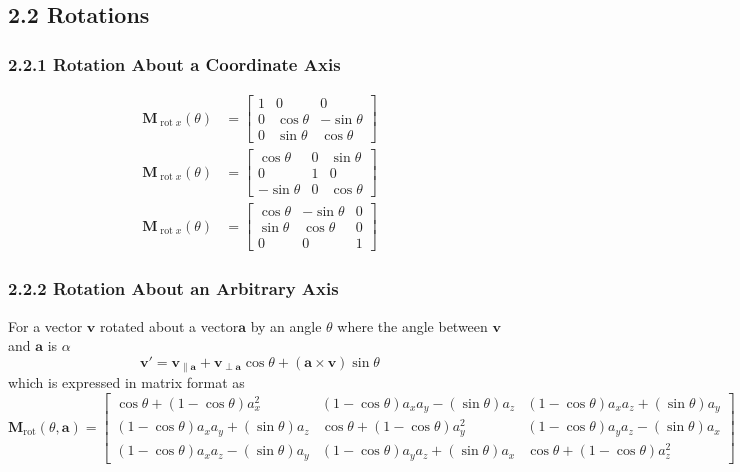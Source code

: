\documentclass[11pt]{article}
\newcommand{\bm}[1]{\mathbf{#1}}
\DeclareMathOperator{\rot}{rot}
\begin{document}
\subsection*{2.2 Rotations}
\subsubsection*{2.2.1 Rotation About a Coordinate Axis}
\begin{align}
    \bm{M}_{\rot x} \left(\theta\right) &= \begin{bmatrix}
        1 & 0 & 0 \\
        0 & \cos \theta & -\sin \theta \\
        0 & \sin \theta & \cos \theta
    \end{bmatrix} \\
    \bm{M}_{\rot x} \left(\theta\right) &= \begin{bmatrix}
        \cos \theta & 0 & \sin \theta \\
        0 & 1 & 0 \\
        -\sin \theta & 0 & \cos \theta
    \end{bmatrix} \\
    \bm{M}_{\rot x} \left(\theta\right) &= \begin{bmatrix}
        \cos \theta & -\sin \theta & 0\\
        \sin \theta & \cos \theta & 0\\
        0 & 0 & 1
    \end{bmatrix}
\end{align}

\subsubsection*{2.2.2 Rotation About an Arbitrary Axis}
For a vector $\bm{v}$ rotated about a vector$\bm{a}$ by an angle $\theta$ where the angle
between $\bm{v}$ and $\bm{a}$ is $\alpha$
\begin{equation}
    \bm{v}' = \bm{v}_{\parallel \bm{a}} + \bm{v}_{\perp \bm{a}} \cos \theta
        + \left( \bm{a} \times \bm{v} \right) \sin \theta
\end{equation}
which is expressed in matrix format as
\begin{equation}
    \bm{M}_{\rot} \left(\theta, \bm{a}\right) = \begin{bmatrix}
        \cos\theta + (1 - \cos\theta) a_x^2 & (1 - \cos\theta) a_xa_y - (\sin\theta) a_z & (1 - \cos\theta) a_xa_z + (\sin\theta)a_y \\
        (1 - \cos\theta) a_xa_y + (\sin\theta) a_z & \cos\theta + (1 - \cos\theta) a_y^2 & (1 - \cos\theta) a_ya_z - (\sin\theta)a_x \\
        (1 - \cos\theta) a_xa_z - (\sin\theta) a_y & (1 - \cos\theta) a_ya_z + (\sin\theta) a_x & \cos\theta + (1 - \cos\theta) a_z^2
    \end{bmatrix}
\end{equation}
\end{document}
